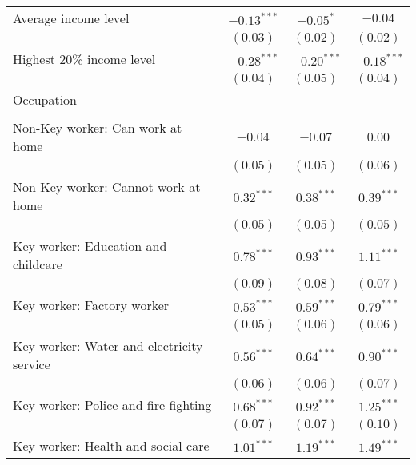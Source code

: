 \begin{table}
\begin{center}
\begin{scriptsize}
\begin{tabular}{l c c c}
\quad Average income level                      & $-0.13^{***}$ & $-0.05^{*}$   & $-0.04$       \\
                                                & $(0.03)$      & $(0.02)$      & $(0.02)$      \\
\quad Highest 20\% income level                 & $-0.28^{***}$ & $-0.20^{***}$ & $-0.18^{***}$ \\
                                                & $(0.04)$      & $(0.05)$      & $(0.04)$      \\
Occupation                                      &               &               &               \\
                                                &               &               &               \\
\quad Non-Key worker: Can work at home          & $-0.04$       & $-0.07$       & $0.00$        \\
                                                & $(0.05)$      & $(0.05)$      & $(0.06)$      \\
\quad Non-Key worker: Cannot work at home       & $0.32^{***}$  & $0.38^{***}$  & $0.39^{***}$  \\
                                                & $(0.05)$      & $(0.05)$      & $(0.05)$      \\
\quad Key worker: Education and childcare       & $0.78^{***}$  & $0.93^{***}$  & $1.11^{***}$  \\
                                                & $(0.09)$      & $(0.08)$      & $(0.07)$      \\
\quad Key worker: Factory worker                & $0.53^{***}$  & $0.59^{***}$  & $0.79^{***}$  \\
                                                & $(0.05)$      & $(0.06)$      & $(0.06)$      \\
\quad Key worker: Water and electricity service & $0.56^{***}$  & $0.64^{***}$  & $0.90^{***}$  \\
                                                & $(0.06)$      & $(0.06)$      & $(0.07)$      \\
\quad Key worker: Police and fire-fighting      & $0.68^{***}$  & $0.92^{***}$  & $1.25^{***}$  \\
                                                & $(0.07)$      & $(0.07)$      & $(0.10)$      \\
\quad Key worker: Health and social care        & $1.01^{***}$  & $1.19^{***}$  & $1.49^{***}$  \\

\end{tabular}
\end{scriptsize}
\end{center}
\end{table}
